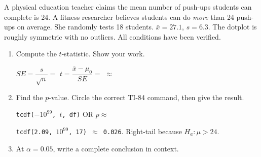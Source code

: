 \documentclass[10pt]{article}
\begin{document}
\namedateperiod

\vspace{0.15in}

A physical education teacher claims the mean number of push-ups students can complete is
24. A fitness researcher believes students can do \emph{more} than 24 push-ups on average.
She randomly tests 18 students. $\bar x = 27.1$, $s = 6.3$. The dotplot is roughly symmetric
with no outliers. All conditions have been verified.

\begin{enumerate}
  \item Compute the $t$-statistic. Show your work.

        $SE = \dfrac{s}{\sqrt{n}} = $  \qquad
        $t = \dfrac{\bar x - \mu_0}{SE} = $  $\approx$ 

  \item Find the $p$-value. Circle the correct TI-84 command, then give the result.

        \texttt{tcdf($-10^{99}$, $t$, df)} \quad OR \quad {} \quad
        $p \approx$ 

        \begin{teachernote}
        \texttt{tcdf(2.09, $10^{99}$, 17) $\approx$ 0.026}. Right-tail because $H_a: \mu > 24$.
        \end{teachernote}

  \item At $\alpha = 0.05$, write a complete conclusion in context.
\end{enumerate}
\end{document}
